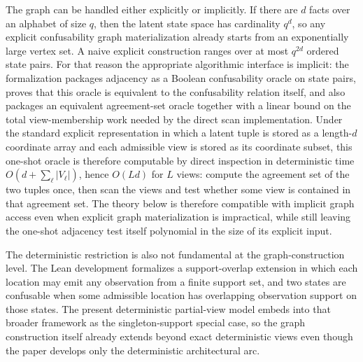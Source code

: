 The graph can be handled either explicitly or implicitly. If there are $d$ facts over an alphabet of size $q$, then the latent state space has cardinality $q^d$, so any explicit confusability graph materialization already starts from an exponentially large vertex set. A naive explicit construction ranges over at most $q^{2d}$ ordered state pairs. For that reason the appropriate algorithmic interface is implicit: the formalization packages adjacency as a Boolean confusability oracle on state pairs, proves that this oracle is equivalent to the confusability relation itself, and also packages an equivalent agreement-set oracle together with a linear bound on the total view-membership work needed by the direct scan implementation. Under the standard explicit representation in which a latent tuple is stored as a length-$d$ coordinate array and each admissible view is stored as its coordinate subset, this one-shot oracle is therefore computable by direct inspection in deterministic time $O(d + \sum_{\ell}|V_\ell|)$, hence $O(Ld)$ for $L$ views: compute the agreement set of the two tuples once, then scan the views and test whether some view is contained in that agreement set. The theory below is therefore compatible with implicit graph access even when explicit graph materialization is impractical, while still leaving the one-shot adjacency test itself polynomial in the size of its explicit input.

The deterministic restriction is also not fundamental at the graph-construction level. The Lean development formalizes a support-overlap extension in which each location may emit any observation from a finite support set, and two states are confusable when some admissible location has overlapping observation support on those states. The present deterministic partial-view model embeds into that broader framework as the singleton-support special case, so the graph construction itself already extends beyond exact deterministic views even though the paper develops only the deterministic architectural arc.

